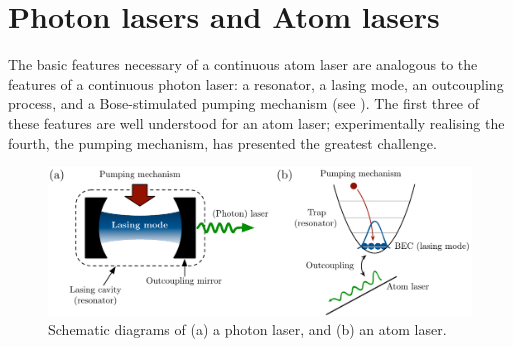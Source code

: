 

\section{Photon lasers and Atom lasers}
\label{Introduction:PhotonAndAtomLasers}

The basic features necessary of a continuous atom laser are analogous to the features of a continuous photon laser: a resonator, a lasing mode, an outcoupling process, and a Bose-stimulated pumping mechanism (see ).  The first three of these features are well understood for an atom laser; experimentally realising the fourth, the pumping mechanism, has presented the greatest challenge.

\begin{figure}
    \centering
    \includegraphics[width=14cm]{LaserAtomLaserComparison}
    \caption{
        \label{Introduction:LaserAtomLaserComparison}
        Schematic diagrams of (a) a photon laser, and (b) an atom laser.
    }
\end{figure}

